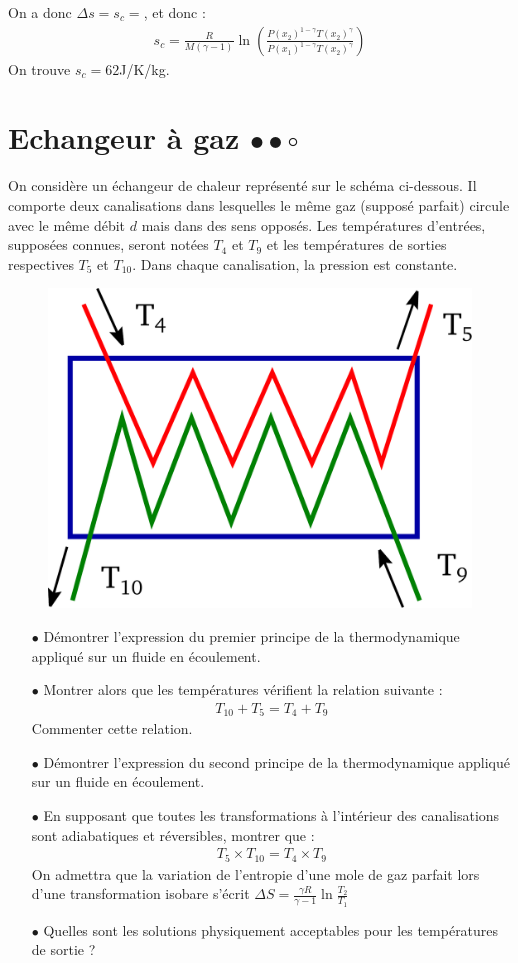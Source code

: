 \documentclass{report}
\begin{document}
\begin{itemize}
On a donc $\Delta s=s_c=$, et donc :
\begin{align*}
	s_c=\frac{R}{M(\gamma-1)}\ln\left(\frac{P(x_2)^{1-\gamma}T(x_2)^\gamma}{P(x_1)^{1-\gamma}T(x_2)^\gamma}\right)
\end{align*}
On trouve $s_c=62$J/K/kg.

\end{itemize}

\newpage

\section*{Echangeur à gaz $\bullet\bullet\circ$}

On considère un échangeur de chaleur représenté sur le schéma ci-dessous. Il comporte deux canalisations dans lesquelles le même gaz (supposé parfait) circule avec le même débit $d$ mais dans des sens opposés. Les températures d'entrées, supposées connues, seront notées $T_{4}$ et $T_{9}$ et les températures de sorties respectives $T_{5}$ et $T_{10}$. Dans chaque canalisation, la pression est constante. 

\begin{figure}[!h]
\centering
\includegraphics[width=0.3\linewidth]{echangeur.pdf}
\end{figure}

\begin{itemize}

	\item[$\bullet$] Démontrer l'expression du premier principe de la thermodynamique appliqué sur un fluide en écoulement.
	
	\item[$\bullet$] Montrer alors que les températures vérifient la relation suivante :
	\begin{align*}
		T_{10}+ T_5 = T_4+T_9
	\end{align*}
	Commenter cette relation.
	
	\item[$\bullet$] Démontrer l'expression du second principe de la thermodynamique appliqué sur un fluide en écoulement.
	
	\item[$\bullet$] En supposant que toutes les transformations à l'intérieur des canalisations sont adiabatiques et réversibles, montrer que :
	\begin{align*}
		T_5\times T_{10}=T_4\times T_9
	\end{align*}
	On admettra que la variation de l'entropie d'une mole de gaz parfait lors d'une transformation isobare s'écrit $\Delta S = \frac{\gamma R}{\gamma-1}\ln\frac{T_2}{T_1}$
	\item[$\bullet$] Quelles sont les solutions physiquement acceptables pour les températures de sortie ?

\end{itemize}
\end{document}
